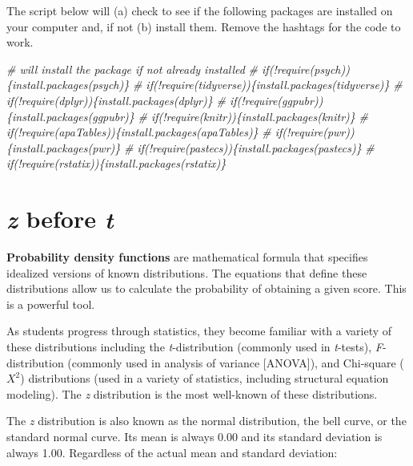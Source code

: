 \documentclass[
  11pt,
]{book}
\newenvironment{Shaded}{\begin{snugshade}}{\end{snugshade}}
\newcommand{\CommentTok}[1]{\textcolor[rgb]{0.37,0.37,0.37}{\textit{#1}}}
\begin{document}
The script below will (a) check to see if the following packages are installed on your computer and, if not (b) install them. Remove the hashtags for the code to work.

\begin{Shaded}
\begin{Highlighting}[]
\CommentTok{\# will install the package if not already installed}
\CommentTok{\# if(!require(psych))\{install.packages(\textquotesingle{}psych\textquotesingle{})\}}
\CommentTok{\# if(!require(tidyverse))\{install.packages(\textquotesingle{}tidyverse\textquotesingle{})\}}
\CommentTok{\# if(!require(dplyr))\{install.packages(\textquotesingle{}dplyr\textquotesingle{})\}}
\CommentTok{\# if(!require(ggpubr))\{install.packages(\textquotesingle{}ggpubr\textquotesingle{})\}}
\CommentTok{\# if(!require(knitr))\{install.packages(\textquotesingle{}knitr\textquotesingle{})\}}
\CommentTok{\# if(!require(apaTables))\{install.packages(\textquotesingle{}apaTables\textquotesingle{})\}}
\CommentTok{\# if(!require(pwr))\{install.packages(\textquotesingle{}pwr\textquotesingle{})\}}
\CommentTok{\# if(!require(pastecs))\{install.packages(\textquotesingle{}pastecs\textquotesingle{})\}}
\CommentTok{\# if(!require(rstatix))\{install.packages(\textquotesingle{}rstatix\textquotesingle{})\}}
\end{Highlighting}
\end{Shaded}

\hypertarget{z-before-t}{%
\section{\texorpdfstring{\emph{z} before \emph{t}}{z before t}}\label{z-before-t}}

\textbf{Probability density functions} are mathematical formula that specifies idealized versions of known distributions. The equations that define these distributions allow us to calculate the probability of obtaining a given score. This is a powerful tool.

As students progress through statistics, they become familiar with a variety of these distributions including the \emph{t}-distribution (commonly used in \emph{t}-tests), \emph{F}-distribution (commonly used in analysis of variance {[}ANOVA{]}), and Chi-square (\(X^2\)) distributions (used in a variety of statistics, including structural equation modeling). The \emph{z} distribution is the most well-known of these distributions.

The \emph{z} distribution is also known as the normal distribution, the bell curve, or the standard normal curve. Its mean is always 0.00 and its standard deviation is always 1.00. Regardless of the actual mean and standard deviation:
\end{document}
